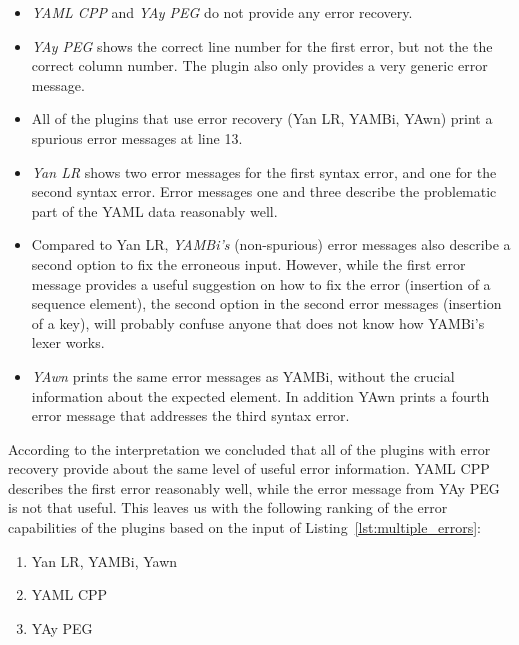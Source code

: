\begin{itemize}

  \item \emph{YAML CPP} and \emph{YAy PEG} do not provide any error recovery.

  \item \emph{YAy PEG} shows the correct line number for the first error, but not the the correct column number. The plugin also only provides a very generic error message.

  \item All of the plugins that use error recovery (Yan LR, YAMBi, YAwn) print a spurious error messages at line 13.

  \item \emph{Yan LR} shows two error messages for the first syntax error, and one for the second syntax error. Error messages one and three describe the problematic part of the YAML data reasonably well.

  \item Compared to Yan LR, \emph{YAMBi’s} (non-spurious) error messages also describe a second option to fix the erroneous input. However, while the first error message provides a useful suggestion on how to fix the error (insertion of a sequence element), the second option in the second error messages (insertion of a key), will probably confuse anyone that does not know how YAMBi’s lexer works.

  \item \emph{YAwn} prints the same error messages as YAMBi, without the crucial information about the expected element. In addition YAwn prints a fourth error message that addresses the third syntax error.

\end{itemize}

According to the interpretation we concluded that all of the plugins with error recovery provide about the same level of useful error information. YAML CPP describes the first error reasonably well, while the error message from YAy PEG is not that useful. This leaves us with the following ranking of the error capabilities of the plugins based on the input of Listing~\ref{lst:multiple_errors}:

\begin{enumerate}
  \item Yan LR, YAMBi, Yawn
  \item YAML CPP
  \item YAy PEG
\end{enumerate}

